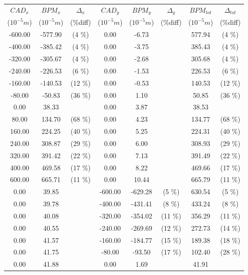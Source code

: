 \begin{table}
\centering
\begin{tabular}{c c c c c c c c}
\toprule
\textbf{$CAD_{x}$} & \textbf{$BPM_{x}$ } & \textbf{$\Delta_{x}$} &\textbf{$CAD_{y}$} & \textbf{$BPM_{y}$} & \textbf{$\Delta_{y}$} & \textbf{$BPM_{tot}$} & \textbf{$\Delta_{tot}$} \\
($10^{-5} m$) & ($10^{-5} m$) & (\%diff) & ($10^{-5} m$) & ($10^{-5} m$) & (\%diff) & ($10^{-5} m$) & (\%diff) \\
\midrule
-600.00 & -577.90 &  (4 \%) & 0.00 & -6.73 &  & 577.94 &  (4 \%)\\
-400.00 & -385.42 &  (4 \%) & 0.00 & -3.75 &  & 385.43 &  (4 \%)\\
-320.00 & -305.67 &  (4 \%) & 0.00 & -2.68 &  & 305.68 &  (4 \%)\\
-240.00 & -226.53 &  (6 \%) & 0.00 & -1.53 &  & 226.53 &  (6 \%)\\
-160.00 & -140.53 &  (12 \%) & 0.00 & -0.53 &  & 140.53 &  (12 \%)\\
-80.00 & -50.83 &  (36 \%) & 0.00 & 1.10 &  & 50.85 &  (36 \%)\\
0.00 & 38.33 &  & 0.00 & 3.87 &  & 38.53 & \\
80.00 & 134.70 &  (68 \%) & 0.00 & 4.23 &  & 134.77 &  (68 \%)\\
160.00 & 224.25 &  (40 \%) & 0.00 & 5.25 &  & 224.31 &  (40 \%)\\
240.00 & 308.87 &  (29 \%) & 0.00 & 6.00 &  & 308.93 &  (29 \%)\\
320.00 & 391.42 &  (22 \%) & 0.00 & 7.13 &  & 391.49 &  (22 \%)\\
400.00 & 469.58 &  (17 \%) & 0.00 & 8.22 &  & 469.66 &  (17 \%)\\
600.00 & 665.71 &  (11 \%) & 0.00 & 10.44 &  & 665.79 &  (11 \%)\\
0.00 & 39.85 &  & -600.00 & -629.28 &  (5 \%) & 630.54 &  (5 \%)\\
0.00 & 39.78 &  & -400.00 & -431.41 &  (8 \%) & 433.24 &  (8 \%)\\
0.00 & 40.08 &  & -320.00 & -354.02 &  (11 \%) & 356.29 &  (11 \%)\\
0.00 & 40.55 &  & -240.00 & -269.69 &  (12 \%) & 272.73 &  (14 \%)\\
0.00 & 41.57 &  & -160.00 & -184.77 &  (15 \%) & 189.38 &  (18 \%)\\
0.00 & 41.75 &  & -80.00 & -93.50 &  (17 \%) & 102.40 &  (28 \%)\\
0.00 & 41.88 &  & 0.00 & 1.69 &  & 41.91 & \\

\end{tabular}
\end{table}
